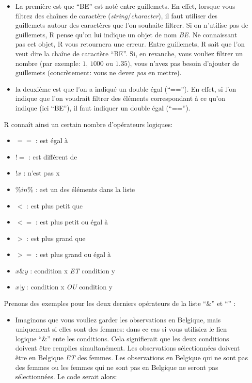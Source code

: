 \documentclass[
]{book}
\providecommand{\tightlist}{%
  \setlength{\itemsep}{0pt}\setlength{\parskip}{0pt}}
\begin{document}
\begin{itemize}
\item
  La première est que ``BE'' est noté entre guillemets. En effet, lorsque vous filtrez des chaînes de caractère (\emph{string}/\emph{character}), il faut utiliser des guillemets autour des caractères que l'on souhaite filtrer. Si on n'utilise pas de guillemets, R pense qu'on lui indique un objet de nom \emph{BE}. Ne connaissant pas cet objet, R vous retournera une erreur. Entre guillemets, R sait que l'on veut dire la chaîne de caractère ``BE''. Si, en revanche, vous vouliez filtrer un nombre (par exemple: \(1\), \(1000\) ou \(1.35\)), vous n'avez pas besoin d'ajouter de guillemets (concrètement: vous ne devez \emph{pas} en mettre).
\item
  la deuxième est que l'on a indiqué un double égal (``==''). En effet, si l'on indique que l'on voudrait filtrer des éléments correspondant à ce qu'on indique (ici ``BE''), il faut indiquer un double égal (``=='').
\end{itemize}

R connaît ainsi un certain nombre d'opérateurs logiques:

\begin{itemize}
\tightlist
\item
  \(==\) : est égal à
\item
  \(!=\) : est différent de
\item
  \(!x\) : n'est pas x
\item
  \(\%in\%\) : est un des éléments dans la liste
\item
  \(<\) : est plus petit que
\item
  \(<=\) : est plus petit ou égal à
\item
  \(>\) : est plus grand que
\item
  \(>=\) : est plus grand ou égal à
\item
  \(x \& y\) : condition x \emph{ET} condition y
\item
  \(x | y\) : condition x \emph{OU} condition y
\end{itemize}

Prenons des exemples pour les deux derniers opérateurs de la liste ``\&'' et ``\textbar{}'' :

\begin{itemize}
\tightlist
\item
  Imaginons que vous vouliez garder les observations en Belgique, mais uniquement si elles sont des femmes: dans ce cas si vous utilisiez le lien logique ``\&'' ente les conditions. Cela signifierait que les deux conditions doivent être remplies simultanément. Les observations sélectionnées doivent être en Belgique \emph{ET} des femmes. Les observations en Belgique qui ne sont pas des femmes ou les femmes qui ne sont pas en Belgique ne seront pas sélectionnées. Le code serait alors:
\end{itemize}
\end{document}
